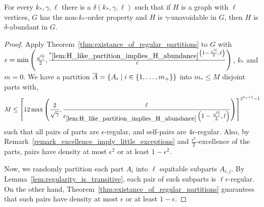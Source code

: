     \theorem \label{lem:property_testing_with_stable_partitions}
        For every $k_*, \gamma, \ell$ there is a $\delta(k_*, \gamma, \ell)$ such that if $H$ is a graph with $\ell$
        vertices, $G$ has the non-$k_*$-order property and $H$ is $\gamma$-unavoidable in $G$, then $H$ is
        $\delta$-abundant in $G$.
        \begin{proof}
            Apply Theorem~\ref{thm:existance_of_regular_partitions} to $G$ with $\epsilon = \min \left( \frac{\sqrt{\gamma}}{2},
                \frac{\epsilon_{\ref{lem:H_like_partition_implies_H_abundance}} \left( 1 - \frac{\sqrt{\gamma}}{2}, \ell \right)}{\ell} \right)$,
            $k_*$ and $m=0$.
            We have a partition $\overline{A} = \left\{ A_i \mid i \in \left\{ 1, \dots, m_+ \right\} \right\}$ into $m_* \leq M$
            disjoint parts with,
            \[
                M \leq \left\lceil 12 \max\left( \frac{2}{\sqrt{\gamma}}, \frac{\ell}{\epsilon_{\ref{lem:H_like_partition_implies_H_abundance}}
                    \left( 1 - \frac{\sqrt{\gamma}}{2}, \ell \right)} \right) \right\rceil^{2^{k_*+1}-1}
            \]
            such that all pairs of parts are $\epsilon$-regular, and self-pairs are $4 \epsilon$-regular.
            Also, by Remark~\ref{remark_excellence_imply_little_exceptions} and $\frac{\epsilon^2}{2}$-excellence of the parts,
            pairs have density at most $\epsilon^2$ or at least $1 - \epsilon^2$. 

            Now, we randomly partition each part $A_i$ into $\ell$ equitable subparts $A_{i,j}$.
            By Lemma~\ref{lem:regularity_is_transitive}, each pair of such subparts is $\ell \epsilon$-regular.
            On the other hand, Theorem~\ref{thm:existance_of_regular_partitions} guarantees that such pairs have density
            at most $\epsilon$ or at least $1 - \epsilon$.


\end{proof}
